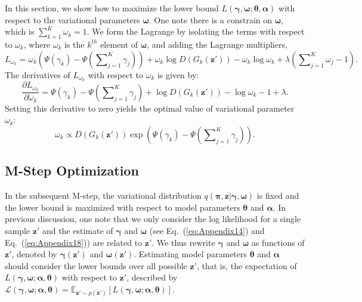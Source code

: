 \documentclass{article}
\begin{document}
In this section, we show how to maximize the lower bound $L\left( \bm{\gamma},\bm{\omega}; \bm{\theta},\bm{\alpha} \right)$ with respect to the variational parameters $\bm{\omega}$.
One note there is a constrain on $\bm{\omega}$, which is $\sum_{k=1}^K\omega_k=1$.
We form the Lagrange by isolating the terms with respect to $\omega_k$, where $\omega_k$ is the $k^{th}$ element of $\bm{\omega}$, and adding the Lagrange multipliers,
\begin{equation}
\label{eq:Append.1.1-1}
L_{\omega_k}
=
\omega_k\left( \Psi \left( \gamma_k \right) - \Psi \left( \sum\nolimits_{j=1}^K \gamma_j \right) \right)
+ \omega_k \log D\left( G_k\left( \mathbf{z}' \right) \right)
- \omega_k \log \omega_k
+\lambda \left( \sum\nolimits_{j=1}^K \omega_j - 1\right).
\end{equation}
\noindent The derivatives of $L_{\omega_k}$ with respect to $\omega_k$ is given by:
\begin{equation}
\label{eq:Appendix13}
\frac{\partial L_{\omega_k}}{\partial \omega_k}
=
\Psi \left( \gamma_k \right) - \Psi \left( \sum\nolimits_{j=1}^K \gamma_j \right) + \log D\left( G_k\left( \mathbf{z}'\right) \right)
- \log \omega_k
- 1
+\lambda.
\end{equation}
Setting this derivative to zero yields the optimal value of variational parameter $\omega_k$:
\begin{equation}
\label{eq:Appendix14}
\omega_k
\propto
D\left( G_k\left( \mathbf{z}'\right) \right)\exp\left( \Psi\left(\gamma_k\right) - \Psi \left( \sum\nolimits_{j=1}^K \gamma_j\right) \right).
\end{equation}



\subsection{M-Step Optimization}
\label{App:PaEstimation}

In the subsequent M-step, the variational distribution $q\left( \bm{\pi}, \mathbf{z}|\bm{\gamma},\bm{\omega} \right)$ is fixed and the lower bound is maximized with respect to model parameters $\bm{\theta}$ and $\bm{\alpha}$.
In previous discussion, one note that we only consider the log likelihood for a single sample $\mathbf{z}'$ and the estimate of $\bm{\gamma}$ and $\bm{\omega}$ (see Eq.~(\ref{eq:Appendix14}) and Eq.~(\ref{eq:Appendix18})) are related to $\mathbf{z}'$.
We thus rewrite $\bm{\gamma}$ and $\bm{\omega}$ as functions of $\mathbf{z}'$, denoted by $\bm{\gamma}\left(\mathbf{z}'\right)$ and $\bm{\omega}\left(\mathbf{z}'\right)$.
Estimating model parameters $\bm{\theta}$ and $\bm{\alpha}$ should consider the lower bounds over all possible $\mathbf{z}'$, that is, the expectation of $L\left( \bm{\gamma},\bm{\omega}; \bm{\alpha},\bm{\theta} \right)$ with respect to $\mathbf{z}'$, described by $\mathcal{L}\left( \bm{\gamma},\bm{\omega}; \bm{\alpha},\bm{\theta}\right) = \mathbb{E}_{\mathbf{z}'\sim p\left(\mathbf{z}'\right)}\left[L\left( \bm{\gamma},\bm{\omega}; \bm{\alpha},\bm{\theta}\right)\right]$.
\end{document}
